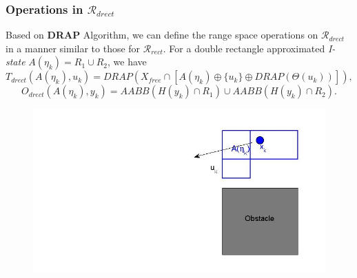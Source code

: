 \documentclass[compress]{beamer}
\begin{document}
\begin{frame} \frametitle{Operations in $\mathcal{R}_{drect}$}

Based on \textbf{DRAP} Algorithm, we can define the range space operations on
$\mathcal{R}_{drect}$ in a manner similar to those for $\mathcal{R}_{rect}$.  For a double rectangle
approximated \emph{I-state} $A(\eta_k) = R_1 \cup R_2$, we have
\begin{equation}
	T_{drect}(A(\eta_k), u_k) = DRAP(X_{free} \cap [A(\eta_k) \oplus \{ u_k \} \oplus DRAP(\Theta(u_k))]),
\end{equation}
\begin{equation}
	O_{drect}(A(\eta_k), y_k) = AABB(H(y_k) \cap R_1)\cup AABB(H(y_k) \cap R_2).
\end{equation}
\begin{figure}
    \includegraphics[scale=0.3]{drectevolve1.jpg}
    \end{figure}
\transboxout
\end{frame}
\end{document}
